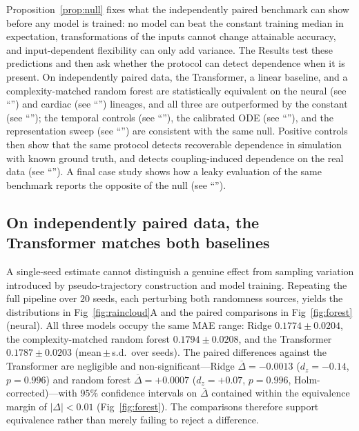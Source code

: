 \documentclass[10pt,letterpaper]{article}
\begin{document}
Proposition~\ref{prop:null} fixes what the independently paired benchmark can show before any model is trained: no model can beat the constant training median in expectation, transformations of the inputs cannot change attainable accuracy, and input-dependent flexibility can only add variance. The Results test these predictions and then ask whether the protocol can detect dependence when it is present. On independently paired data, the Transformer, a linear baseline, and a complexity-matched random forest are statistically equivalent on the neural (see ``'') and cardiac (see ``'') lineages, and all three are outperformed by the constant (see ``''); the temporal controls (see ``''), the calibrated ODE (see ``''), and the representation sweep (see ``'') are consistent with the same null. Positive controls then show that the same protocol detects recoverable dependence in simulation with known ground truth, and detects coupling-induced dependence on the real data (see ``''). A final case study shows how a leaky evaluation of the same benchmark reports the opposite of the null (see ``'').

\subsection*{On independently paired data, the Transformer matches both baselines}
\label{subsec:res_neural}

A single-seed estimate cannot distinguish a genuine effect from sampling variation introduced by pseudo-trajectory construction and model training. Repeating the full pipeline over $20$ seeds, each perturbing both randomness sources, yields the distributions in Fig~\ref{fig:raincloud}A and the paired comparisons in Fig~\ref{fig:forest} (neural). All three models occupy the same MAE range: Ridge $0.1774\pm0.0204$, the complexity-matched random forest $0.1794\pm0.0208$, and the Transformer $0.1787\pm0.0203$ (mean\,$\pm$\,s.d.\ over seeds). The paired differences against the Transformer are negligible and non-significant---Ridge $\overline{\Delta}=-0.0013$ ($d_z=-0.14$, $p=0.996$) and random forest $\overline{\Delta}=+0.0007$ ($d_z=+0.07$, $p=0.996$, Holm-corrected)---with $95\%$ confidence intervals on $\overline{\Delta}$ contained within the equivalence margin of $|\Delta|<0.01$ (Fig~\ref{fig:forest}). The comparisons therefore support equivalence rather than merely failing to reject a difference.
\end{document}
